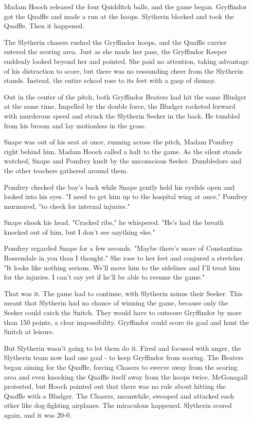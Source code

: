 Madam Hooch released the four Quidditch balls, and the game began. Gryffindor got the Quaffle and made a run at the hoops. Slytherin blocked and took the Quaffle. Then it happened.

The Slytherin chasers rushed the Gryffindor hoops, and the Quaffle carrier entered the scoring area. Just as she made her pass, the Gryffindor Keeper suddenly looked beyond her and pointed. She paid no attention, taking advantage of his distraction to score, but there was no resounding cheer from the Slytherin stands. Instead, the entire school rose to its feet with a gasp of dismay.

Out in the center of the pitch, both Gryffindor Beaters had hit the same Bludger at the same time. Impelled by the double force, the Bludger rocketed forward with murderous speed and struck the Slytherin Seeker in the back. He tumbled from his broom and lay motionless in the grass.

Snape was out of his seat at once, running across the pitch, Madam Pomfrey right behind him. Madam Hooch called a halt to the game. As the silent stands watched, Snape and Pomfrey knelt by the unconscious Seeker. Dumbledore and the other teachers gathered around them.

Pomfrey checked the boy's back while Snape gently held his eyelids open and looked into his eyes. "I need to get him up to the hospital wing at once," Pomfrey murmured, "to check for internal injuries."

Snape shook his head. "Cracked ribs," he whispered. "He's had the breath knocked out of him, but I don't see anything else."

Pomfrey regarded Snape for a few seconds. "Maybe there's more of Constantina Rossendale in you than I thought." She rose to her feet and conjured a stretcher. "It looks like nothing serious. We'll move him to the sidelines and I'll treat him for the injuries. I can't say yet if he'll be able to resume the game."

That was it. The game had to continue, with Slytherin minus their Seeker. This meant that Slytherin had no chance of winning the game, because only the Seeker could catch the Snitch. They would have to outscore Gryffindor by more than 150 points, a clear impossibility. Gryffindor could score its goal and hunt the Snitch at leisure.

But Slytherin wasn't going to let them do it. Fired and focused with anger, the Slytherin team now had one goal - to keep Gryffindor from scoring. The Beaters began aiming for the Quaffle, forcing Chasers to swerve away from the scoring area and even knocking the Quaffle itself away from the hoops twice. McGonagall protested, but Hooch pointed out that there was no rule about hitting the Quaffle with a Bludger. The Chasers, meanwhile, swooped and attacked each other like dog-fighting airplanes. The miraculous happened. Slytherin scored again, and it was 20-0.

